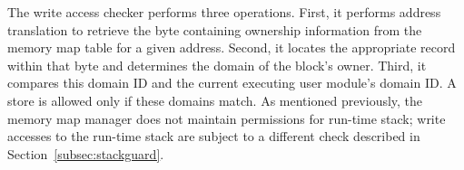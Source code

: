 The write access checker performs three operations.
%
First, it performs address translation to retrieve the byte containing
ownership information from the memory map table for a given address.
%
Second, it locates the appropriate record within that byte and determines
the domain of the block's owner.
%
Third, it compares this domain ID and the current executing user module's domain ID.
%
A store is allowed only if these domains match.
%
As mentioned previously, the memory map manager does not maintain
permissions for run-time stack;
%
write accesses to the run-time stack are subject to a different
check described in Section~\ref{subsec:stackguard}.
%

%

